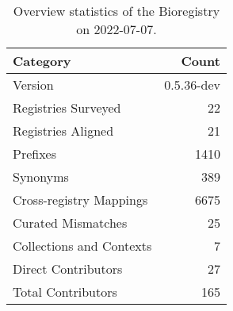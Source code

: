\begin{table}
\centering
\caption{Overview statistics of the Bioregistry on 2022-07-07.}
\label{tab:bioregistry-summary}
\begin{tabular}{lr}
\toprule
                Category &      Count \\
\midrule
                 Version & 0.5.36-dev \\
     Registries Surveyed &         22 \\
      Registries Aligned &         21 \\
                Prefixes &       1410 \\
                Synonyms &        389 \\
 Cross-registry Mappings &       6675 \\
      Curated Mismatches &         25 \\
Collections and Contexts &          7 \\
     Direct Contributors &         27 \\
      Total Contributors &        165 \\
\bottomrule
\end{tabular}
\end{table}
